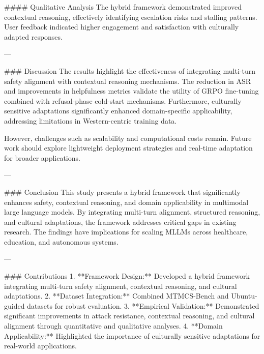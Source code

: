 #### Qualitative Analysis  
The hybrid framework demonstrated improved contextual reasoning, effectively identifying escalation risks and stalling patterns. User feedback indicated higher engagement and satisfaction with culturally adapted responses.  

---

### Discussion  
The results highlight the effectiveness of integrating multi-turn safety alignment with contextual reasoning mechanisms. The reduction in ASR and improvements in helpfulness metrics validate the utility of GRPO fine-tuning combined with refusal-phase cold-start mechanisms. Furthermore, culturally sensitive adaptations significantly enhanced domain-specific applicability, addressing limitations in Western-centric training data.  

However, challenges such as scalability and computational costs remain. Future work should explore lightweight deployment strategies and real-time adaptation for broader applications.  

---

### Conclusion  
This study presents a hybrid framework that significantly enhances safety, contextual reasoning, and domain applicability in multimodal large language models. By integrating multi-turn alignment, structured reasoning, and cultural adaptations, the framework addresses critical gaps in existing research. The findings have implications for scaling MLLMs across healthcare, education, and autonomous systems.  

---

### Contributions  
1. **Framework Design:** Developed a hybrid framework integrating multi-turn safety alignment, contextual reasoning, and cultural adaptations.  
2. **Dataset Integration:** Combined MTMCS-Bench and Ubuntu-guided datasets for robust evaluation.  
3. **Empirical Validation:** Demonstrated significant improvements in attack resistance, contextual reasoning, and cultural alignment through quantitative and qualitative analyses.  
4. **Domain Applicability:** Highlighted the importance of culturally sensitive adaptations for real-world applications.  